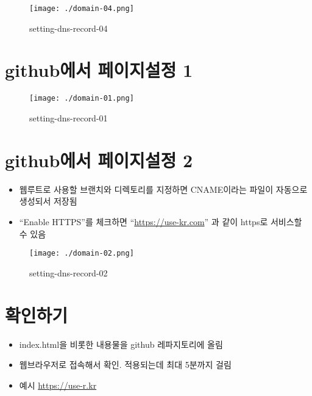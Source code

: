 \documentclass[
]{article}
\providecommand{\tightlist}{%
  \setlength{\itemsep}{0pt}\setlength{\parskip}{0pt}}
\begin{document}
\begin{figure}
\centering
\texttt{[image: ./domain-04.png]}
\caption{setting-dns-record-04}
\end{figure}

\hypertarget{githubuxc5d0uxc11c-uxd398uxc774uxc9c0uxc124uxc815-1}{%
\section{github에서 페이지설정
1}\label{githubuxc5d0uxc11c-uxd398uxc774uxc9c0uxc124uxc815-1}}

\begin{figure}
\centering
\texttt{[image: ./domain-01.png]}
\caption{setting-dns-record-01}
\end{figure}

\hypertarget{githubuxc5d0uxc11c-uxd398uxc774uxc9c0uxc124uxc815-2}{%
\section{github에서 페이지설정
2}\label{githubuxc5d0uxc11c-uxd398uxc774uxc9c0uxc124uxc815-2}}

\begin{itemize}
\tightlist
\item
  웹루트로 사용할 브랜치와 디렉토리를 지정하면 CNAME이라는 파일이
  자동으로 생성되서 저장됨
\item
  ``Enable HTTPS''를 체크하면 ``\url{https://use-kr.com}'' 과 같이
  https로 서비스할 수 있음
\end{itemize}

\begin{figure}
\centering
\texttt{[image: ./domain-02.png]}
\caption{setting-dns-record-02}
\end{figure}

\hypertarget{uxd655uxc778uxd558uxae30}{%
\section{확인하기}\label{uxd655uxc778uxd558uxae30}}

\begin{itemize}
\tightlist
\item
  index.html을 비롯한 내용물을 github 레파지토리에 올림
\item
  웹브라우저로 접속해서 확인. 적용되는데 최대 5분까지 걸림
\item
  예시 \href{}{https://use-r.kr}
\end{itemize}
\end{document}

